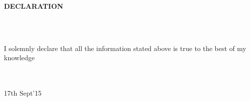 \documentclass[a4paper,10pt]{article}
\newcommand{\lsep}{-0.5cm}
\newcommand{\resheading}[1]{{\small \colorbox{mygrey}{\begin{minipage}{0.975\textwidth}{\textbf{#1 \vphantom{p\^{E}}}}\end{minipage}}}}
\begin{document}
\resheading{\textbf{DECLARATION}}\\[\lsep]\\[0.3cm]
\begin{center}
I solemnly declare that all the information stated above is true
to the best of my knowledge\\[3cm]
\hline
\hline \\[0.7cm]
\end{center}



\\[0.3cm]
 17th Sept'15
	
\end{document}
